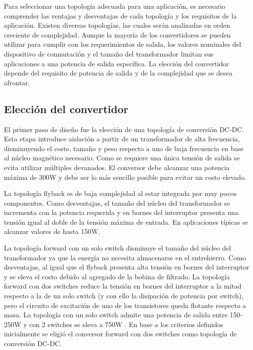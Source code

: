 Para seleccionar una topología adecuada para una aplicación, es necesario comprender las ventajas y desventajas de cada topología y los requisitos de la aplicación. 
Existen diversas topologías, las cuales serán analizadas en orden creciente de complejidad. 
Aunque la mayoría de los convertidores se pueden utilizar para cumplir con los requerimientos de salida, 
los valores nominales del dispositivo de conmutación y el tamaño del transformador limitan sus aplicaciones a una potencia de salida específica. 
La elección del convertidor depende del requisito de potencia de salida y de la complejidad que se desea afrontar.

\subsection{Elección del convertidor}

El primer paso de diseño fue la elección de una topología de conversión DC-DC.
Esta etapa introduce aislación a partir de un transformador de alta frecuencia,
disminuyendo el coste, tamaño y peso respecto a uno de baja frecuencia en base al núcleo magnético necesario.
Como se requiere una única tensión de salida se evita utilizar múltiples devanados.
El conversor debe alcanzar una potencia máxima de 300W y debe ser lo más sencillo posible para evitar un costo elevado. 

La topología flyback es de baja complejidad al estar integrada por muy pocos componentes. 
Como desventajas, el tamaño del núcleo del transformador se incrementa con la potencia requerida y en bornes del
interruptor presenta una tensión igual al doble de la tensión máxima de entrada.
En aplicaciones típicas se alcanzar valores de hasta 150W.

La topología forward con un solo switch disminuye el tamaño del núcleo del transformador ya que la energía no necesita almacenarse en el entrehierro.
Como desventajas, al igual que el flyback presenta alta tensión en bornes del interruptor y se eleva el costo debido al agregado de la bobina de filtrado.
La topología forward con dos switches reduce la tensión en bornes del interruptor a la mitad respecto a la de un solo switch (y con ello la disipación de potencia por switch), 
pero el circuito de excitación de uno de los transistores queda flotante respecto a masa. 
La topología con un solo switch admite una potencia de salida entre 150-250W y con 2 switches se eleva a 750W \cite{mohan}\cite{hart}. 
En base a los criterios definidos inicialmente se eligió el conversor forward con dos switches como topología de conversión DC-DC. 

